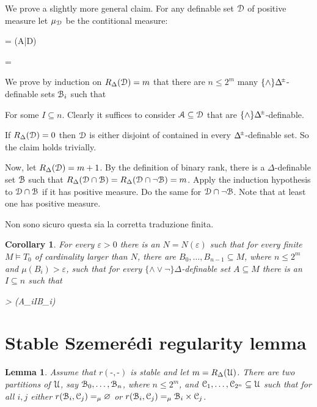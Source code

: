 \documentclass[10pt,oneside, openany]{book}
\def\models{\vDash}
\def\pmDelta{\Delta\hskip-.3ex\raisebox{1ex}{\tiny$\pm$}}
\def\simdiff{\mathop\vartriangle}
\def\D{\EuScript D}
\def\Aa{\EuScript A}
\def\C{\EuScript C}
\def\U{\EuScript U}
\def\B{\EuScript B}
\def\0{\varnothing}
\def\epsilon{\varepsilon}
\newcounter{thm}[chapter]
\theoremstyle{mio}
\newtheorem{corollary}[thm]{Corollary}
\newtheorem{lemma}[thm]{Lemma}
\theoremstyle{liscio}
\def\QED{\noindent\nolinebreak[4]\hfill\rlap{\ \ $\Box$}\medskip}
\renewenvironment{proof}[1][Proof]%
{\smallskip\begin{trivlist}\item[\hskip\labelsep {\bf #1}]}
{\QED\end{trivlist}}
\begin{document}
\begin{proof}
  We prove a slightly more general claim.
  For any definable set $\D$ of positive measure let $\mu_\D$ be the contitional measure:

  \ceq{\hfill\mu_\D(\Aa)}
  {=}
  {\mu(\Aa|\D)}

  \ceq{}
  {=}
  {\frac{\mu(\Aa\cap\D)}{\mu(\D)}}

  We prove by induction on $R_\Delta(\D)=m$ that there are $n\le 2^m$ many $\{\wedge\}\pmDelta$-definable sets $\B_i$ such that

  \ceq{\hfill\Aa}{=_\mu}{\bigcup_{i\in I}\B_i}

  For some $I\subseteq n$.
  Clearly it suffices to consider $\Aa\subseteq\D$ that are $\{\wedge\}\pmDelta$-definable. 

  If  $R_\Delta(\D)=0$ then $\D$ is either disjoint of contained in every $\pmDelta$-definable set.
  So the claim holds trivially.

  Now, let $R_\Delta(\D)=m+1$.
  By the definition of binary rank, there is a $\Delta$-definable set $\B$ such that $R_\Delta(\D\cap\B)=R_\Delta(\D\cap\neg\B)=m$.
  Apply the induction hypothesis to $\D\cap\B$ if it has positive measure. 
  Do the same for $\D\cap\neg\B$.
  Note that at least one has positive measure.
\end{proof}
 
Non sono sicuro questa sia la corretta traduzione finita.

\begin{corollary}
  For every $\epsilon>0$ there is an $N=N(\epsilon)$ such that for every finite $M\models T_0$ of cardinality larger than $N$, there are $B_0,\dots,B_{n-1}\subseteq M$, where $n\le2^m$ and $\mu(B_i)>\epsilon$, such that for every $\{{\wedge}{\vee}{\neg}\}\Delta$-definable set $A\subseteq M$ there is an $I\subseteq n$ such that 

  \ceq{\hfill\epsilon}
  {>}
  {\mu\bigg(A\simdiff\bigcup_{i\in I}B_i\bigg)}
\end{corollary}


\section{Stable Szemer\'edi regularity lemma}

\begin{lemma}
  Assume that $r(\mbox{-},\mbox{-})$ is stable and let $m=R_\Delta(\U)$.
  There are two partitions of $\U$, say $\B_0,\dots,\B_n$, where $n\le 2^m$, and $\C_1,\dots,\C_{2^n}\subseteq\U$ such that for all $i,j$ either $r(\B_i,\C_j)=_\mu\0$ or $r(\B_i,\C_j)=_\mu\B_i\times\C_j$.
\end{lemma}
\end{document}
